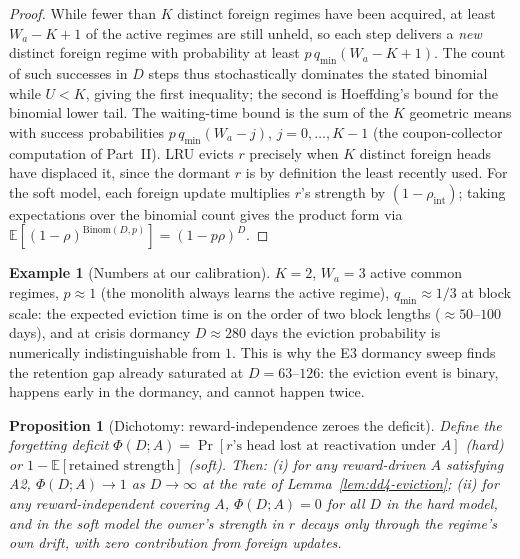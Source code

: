 \documentclass[11pt,a4paper]{article}
\theoremstyle{definition}
\newtheorem{example}{Example}[section]
\theoremstyle{plain}
\newtheorem{proposition}{Proposition}[section]
\newcommand{\E}{\mathbb{E}}
\begin{document}
\begin{proof}
While fewer than $K$ distinct foreign regimes have been acquired, at
least $W_a - K + 1$ of the active regimes are still unheld, so each step
delivers a \emph{new} distinct foreign regime with probability at least
$p\, q_{\min} (W_a - K + 1)$. The count of such successes in $D$ steps
thus stochastically dominates the stated binomial while $U < K$, giving
the first inequality; the second is Hoeffding's bound for the binomial
lower tail. The waiting-time bound is the sum of the $K$ geometric means
with success probabilities $p\, q_{\min}(W_a - j)$, $j = 0, \dots,
K{-}1$ (the coupon-collector computation of Part~II). LRU evicts $r$
precisely when $K$ distinct foreign heads have displaced it, since the
dormant $r$ is by definition the least recently used. For the soft
model, each foreign update multiplies $r$'s strength by
$(1 - \rho_{\mathrm{int}})$; taking expectations over the binomial count
gives the product form via $\E[(1-\rho)^{\mathrm{Binom}(D,p)}] =
(1 - p\rho)^D$.
\end{proof}

\begin{example}[Numbers at our calibration]
$K = 2$, $W_a = 3$ active common regimes, $p \approx 1$ (the monolith
always learns the active regime), $q_{\min} \approx 1/3$ at block scale:
the expected eviction time is on the order of two block lengths
($\approx 50$--$100$ days), and at crisis dormancy $D \approx 280$ days
the eviction probability is numerically indistinguishable from $1$. This
is why the E3 dormancy sweep finds the retention gap already saturated
at $D = 63$--$126$: the eviction event is binary, happens early in the
dormancy, and cannot happen twice.
\end{example}

\begin{proposition}[Dichotomy: reward-independence zeroes the deficit]
\label{prop:dd4-dichotomy}
Define the forgetting deficit
$\Phi(D; A) = \Pr[\text{$r$'s head lost at reactivation under } A]$
(hard) or $1 - \E[\text{retained strength}]$ (soft). Then:
(i) for any reward-driven $A$ satisfying A2,
$\Phi(D; A) \to 1$ as $D \to \infty$ at the rate of
Lemma~\ref{lem:dd4-eviction}; (ii) for any reward-independent covering
$A$, $\Phi(D; A) = 0$ for all $D$ in the hard model, and in the soft
model the owner's strength in $r$ decays only through the regime's own
drift, with \emph{zero} contribution from foreign updates.
\end{proposition}
\end{document}
